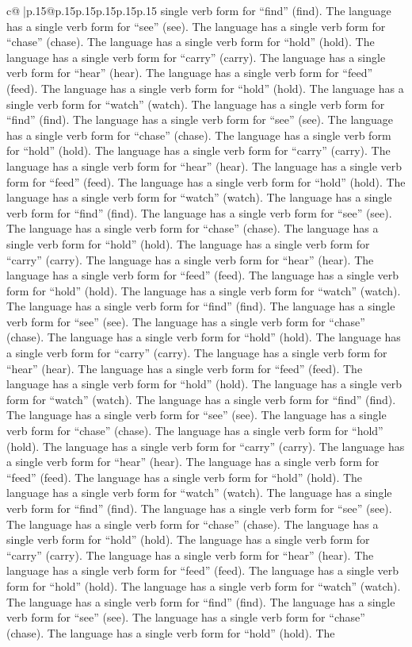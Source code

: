\documentclass{article}
\begin{document}
{\begin{supertabular}{c@{$\;$}|p{.15\linewidth}@{}p{.15\linewidth}p{.15\linewidth}p{.15\linewidth}p{.15\linewidth}p{.15\linewidth}}
{{{single verb form for “find” (find). The language has a single verb form for “see” (see). The language has a single verb form for “chase” (chase). The language has a single verb form for “hold” (hold). The language has a single verb form for “carry” (carry). The language has a single verb form for “hear” (hear). The language has a single verb form for “feed” (feed). The language has a single verb form for “hold” (hold). The language has a single verb form for “watch” (watch). The language has a single verb form for “find” (find). The language has a single verb form for “see” (see). The language has a single verb form for “chase” (chase). The language has a single verb form for “hold” (hold). The language has a single verb form for “carry” (carry). The language has a single verb form for “hear” (hear). The language has a single verb form for “feed” (feed). The language has a single verb form for “hold” (hold). The language has a single verb form for “watch” (watch). The language has a single verb form for “find” (find). The language has a single verb form for “see” (see). The language has a single verb form for “chase” (chase). The language has a single verb form for “hold” (hold). The language has a single verb form for “carry” (carry). The language has a single verb form for “hear” (hear). The language has a single verb form for “feed” (feed). The language has a single verb form for “hold” (hold). The language has a single verb form for “watch” (watch). The language has a single verb form for “find” (find). The language has a single verb form for “see” (see). The language has a single verb form for “chase” (chase). The language has a single verb form for “hold” (hold). The language has a single verb form for “carry” (carry). The language has a single verb form for “hear” (hear). The language has a single verb form for “feed” (feed). The language has a single verb form for “hold” (hold). The language has a single verb form for “watch” (watch). The language has a single verb form for “find” (find). The language has a single verb form for “see” (see). The language has a single verb form for “chase” (chase). The language has a single verb form for “hold” (hold). The language has a single verb form for “carry” (carry). The language has a single verb form for “hear” (hear). The language has a single verb form for “feed” (feed). The language has a single verb form for “hold” (hold). The language has a single verb form for “watch” (watch). The language has a single verb form for “find” (find). The language has a single verb form for “see” (see). The language has a single verb form for “chase” (chase). The language has a single verb form for “hold” (hold). The language has a single verb form for “carry” (carry). The language has a single verb form for “hear” (hear). The language has a single verb form for “feed” (feed). The language has a single verb form for “hold” (hold). The language has a single verb form for “watch” (watch). The language has a single verb form for “find” (find). The language has a single verb form for “see” (see). The language has a single verb form for “chase” (chase). The language has a single verb form for “hold” (hold). The }}}
\end{supertabular}}
\end{document}
